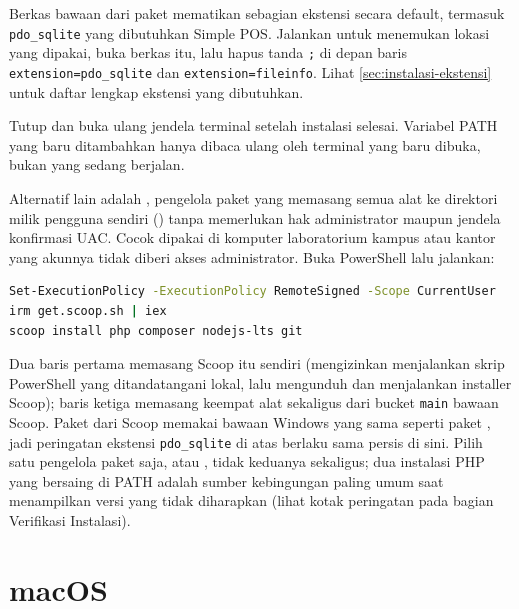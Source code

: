 \begin{warningbox}
Berkas  bawaan dari paket  mematikan
sebagian ekstensi secara default, termasuk \texttt{pdo\_sqlite} yang
dibutuhkan Simple POS. Jalankan  untuk menemukan lokasi
 yang dipakai, buka berkas itu, lalu hapus tanda \texttt{;}
di depan baris \texttt{extension=pdo\_sqlite} dan
\texttt{extension=fileinfo}. Lihat \cref{sec:instalasi-ekstensi} untuk
daftar lengkap ekstensi yang dibutuhkan.
\end{warningbox}

\begin{tipbox}
Tutup dan buka ulang jendela terminal setelah instalasi 
selesai. Variabel PATH yang baru ditambahkan hanya dibaca ulang oleh
terminal yang baru dibuka, bukan yang sedang berjalan.
\end{tipbox}

Alternatif lain adalah , pengelola paket yang memasang semua
alat ke direktori milik pengguna sendiri () tanpa memerlukan hak administrator maupun jendela konfirmasi UAC.
Cocok dipakai di komputer laboratorium kampus atau kantor yang akunnya
tidak diberi akses administrator. Buka PowerShell lalu jalankan:

\begin{lstlisting}[language=bash]
Set-ExecutionPolicy -ExecutionPolicy RemoteSigned -Scope CurrentUser
irm get.scoop.sh | iex
scoop install php composer nodejs-lts git
\end{lstlisting}

\begin{notebox}
Dua baris pertama memasang Scoop itu sendiri (mengizinkan menjalankan
skrip PowerShell yang ditandatangani lokal, lalu mengunduh dan menjalankan
installer Scoop); baris ketiga memasang keempat alat sekaligus dari
bucket \texttt{main} bawaan Scoop. Paket  dari Scoop memakai
 bawaan Windows yang sama seperti paket , jadi
peringatan ekstensi \texttt{pdo\_sqlite} di atas berlaku sama persis di
sini. Pilih satu pengelola paket saja,  atau ,
tidak keduanya sekaligus; dua instalasi PHP yang bersaing di PATH adalah
sumber kebingungan paling umum saat  menampilkan versi yang
tidak diharapkan (lihat kotak peringatan pada bagian Verifikasi
Instalasi).
\end{notebox}

\section{macOS}

